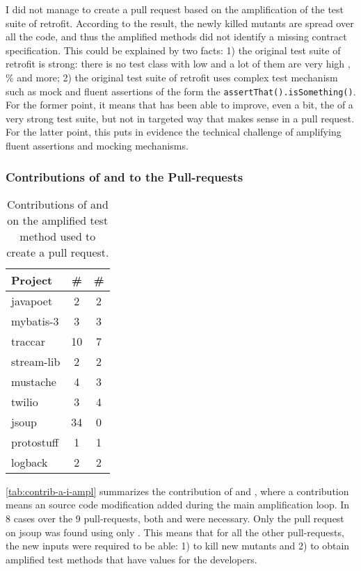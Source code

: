 I did not manage to create a pull request based on the amplification of the test suite of retrofit. 
According to the result, the newly killed mutants are spread over all the code, and thus the amplified methods did not identify a missing contract specification. 
This could be explained by two facts: 
1) the original test suite of retrofit is strong: there is no test class with low \ms and a lot of them are very high \ms, \% and more;
2) the original test suite of retrofit uses complex test mechanism such as mock and fluent assertions of the form the \texttt{assertThat().isSomething()}. 
For the former point, it means that \dspot has been able to improve, even a bit, the \ms of a very strong test suite, but not in targeted way that makes sense in a pull request.
For the latter point, this puts in evidence the technical challenge of amplifying fluent assertions and mocking mechanisms.

\subsubsection{Contributions of \Aampl and \Iampl to the Pull-requests}

\begin{table}[]
	\caption{Contributions of \Aampl and \Iampl on the amplified test method used to create a pull request.}
	\label{tab:contrib-a-i-ampl}
	\centering
    \begin{adjustbox}{max width=\textwidth,center=\textwidth}
		\begin{tabular}{lcc}
			\toprule
			Project & \#\Aampl &  \#\Iampl \\
			\midrule
			javapoet & 2 & 2 \\
			mybatis-3 & 3 & 3 \\
			traccar & 10 & 7 \\
			stream-lib & 2 & 2 \\
			mustache & 4 & 3 \\
			twilio & 3 & 4 \\
			jsoup & 34 & 0 \\
			protostuff & 1 & 1 \\
			logback & 2 & 2 \\
			\bottomrule
		\end{tabular}
	\end{adjustbox}
\end{table}

\autoref{tab:contrib-a-i-ampl} summarizes the contribution of \Aampl and \Iampl, where a contribution means an source code modification added during the main amplification loop. 
In 8 cases over the 9 pull-requests, both \Aampl and \Iampl were necessary. 
Only the pull request on jsoup was found using only \Aampl. 
This means that for all the other pull-requests, the new inputs were required to be able: 
1) to kill new mutants and 
2) to obtain amplified test methods that have values for the developers.

